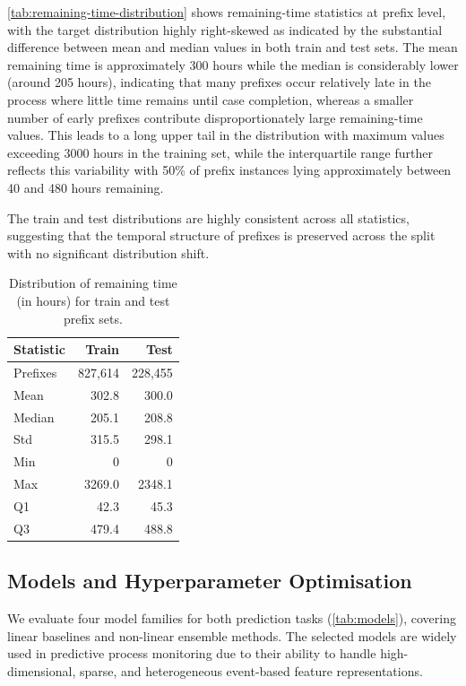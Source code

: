 \documentclass[runningheads]{llncs}
\begin{document}
\autoref{tab:remaining-time-distribution} shows remaining-time statistics at prefix level, with the target distribution highly right-skewed as indicated by the substantial difference between mean and median values in both train and test sets. The mean remaining time is approximately 300 hours while the median is considerably lower (around 205 hours), indicating that many prefixes occur relatively late in the process where little time remains until case completion, whereas a smaller number of early prefixes contribute disproportionately large remaining-time values. This leads to a long upper tail in the distribution with maximum values exceeding 3000 hours in the training set, while the interquartile range further reflects this variability with 50\% of prefix instances lying approximately between 40 and 480 hours remaining. 

The train and test distributions are highly consistent across all statistics, suggesting that the temporal structure of prefixes is preserved across the split with no significant distribution shift.

\begin{table}[H]
    \centering
    \caption{Distribution of remaining time (in hours) for train and test prefix sets.}
    \label{tab:remaining-time-distribution}
    \begin{tabular}{lrr}
        \toprule
        Statistic & Train & Test \\
        \midrule
        Prefixes & 827,614 & 228,455 \\
        Mean     & 302.8 & 300.0 \\
        Median   & 205.1 & 208.8 \\
        Std      & 315.5 & 298.1 \\
        Min      & 0   & 0 \\
        Max      & 3269.0 & 2348.1 \\
        Q1       & 42.3  & 45.3 \\
        Q3       & 479.4 & 488.8 \\
        \bottomrule
    \end{tabular}
\end{table}



\subsection{Models and Hyperparameter Optimisation}
\label{sec:model-list}

We evaluate four model families for both prediction tasks (\autoref{tab:models}),
covering linear baselines and non-linear ensemble methods. The selected models
are widely used in predictive process monitoring due to their ability to handle
high-dimensional, sparse, and heterogeneous event-based feature representations.
\end{document}
